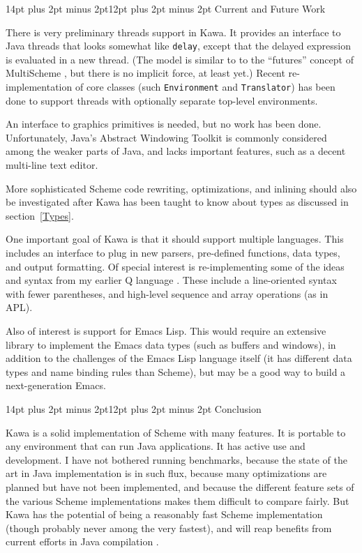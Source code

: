 \documentclass[twocolumn]{article}
\makeatletter
\def\section{\@startsection {section}{1}{\z@}
   {14pt plus 2pt minus 2pt}{12pt plus 2pt minus 2pt} {\large\bf}}
\makeatother
\begin{document}
\section{Current and Future Work}

There is very  preliminary threads support in Kawa.
It provides an interface to Java threads that looks
somewhat like {\tt delay}, except that the delayed expression
is evaluated in a new thread.  (The model is similar to
to the ``futures'' concept of MultiScheme \cite{Miller:phd:1987},
but there is no implicit force, at least yet.)  Recent re-implementation
of core classes (such {\tt Environment} and {\tt Translator})
has been done to support threads with optionally separate
top-level environments.

An interface to graphics primitives is needed, but no work has been
done.  Unfortunately, Java's Abstract Windowing Toolkit is commonly
considered among the weaker parts of Java, and lacks important
features, such as a decent multi-line text editor.

More sophisticated Scheme code rewriting, optimizations,
and inlining should also be investigated after Kawa has been
taught to know about types as discussed in section~\ref{Types}.

One important goal of Kawa is that it should support
multiple languages.  This includes an interface to plug in
new parsers, pre-defined functions, data types, and output
formatting.
Of special interest is re-implementing some of the ideas and syntax
from my earlier Q language  \cite{PBthesis}. These include a
line-oriented syntax with fewer parentheses, and high-level
sequence and array operations (as in APL).

Also of interest is support for Emacs Lisp.
This would require an extensive library to implement the Emacs
data types (such as buffers and windows), in addition to the
challenges of the Emacs Lisp language itself (it has different
data types and name binding rules than Scheme), but may be
a good way to build a next-generation Emacs.

\section{Conclusion}

Kawa is a solid implementation of Scheme with many features.
It is portable to any environment that can run Java applications.
It has active use and development.
I have not bothered running benchmarks, because the state
of the art in Java implementation is in such flux, because
many optimizations are planned but have not been implemented,
and because the different feature sets of the various Scheme implementations
makes them difficult to compare fairly.
But Kawa has the potential of being
a reasonably fast Scheme implementation (though probably never
among the very fastest), and will reap benefits from current
efforts in Java compilation \cite{GccJava}.
\end{document}
